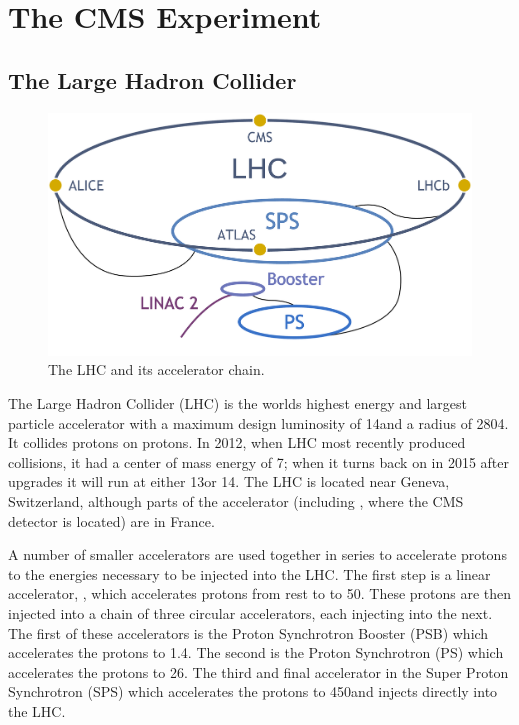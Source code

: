 
\chapter{The CMS Experiment}
\label{experiment_chapter}

\section{The Large Hadron Collider}
\label{lhc_section}

\begin{figure}[tb]
    \centering
    \includegraphics[width=\textwidth]{figures/alex_lhc_layout.pdf}
    \caption{The LHC and its accelerator chain.}
    \label{fig:lhc_layout}
\end{figure}

The Large Hadron Collider (LHC) is the worlds highest energy and largest
particle accelerator with a maximum design luminosity of 14\TeV and a radius of
2804\meters \cite{bruning2004}. It collides protons on protons. In 2012, when
LHC most recently produced collisions, it had a center of mass energy of 7\TeV;
when it turns back on in 2015 after upgrades it will run at either 13\TeV or
14\TeV. The LHC is located near Geneva, Switzerland, although parts of the
accelerator (including \pointfive, where the CMS detector is located) are in
France.

A number of smaller accelerators are used together in series to accelerate
protons to the energies necessary to be injected into the LHC. The first step
is a linear accelerator, \linactwo, which accelerates protons from rest to to
50\MeV. These protons are then injected into a chain of three circular
accelerators, each injecting into the next. The first of these accelerators is
the Proton Synchrotron Booster (PSB) which accelerates the protons to 1.4\GeV.
The second is the Proton Synchrotron (PS) which accelerates the protons to
26\GeV. The third and final accelerator in the Super Proton Synchrotron (SPS)
which accelerates the protons to 450\GeV and injects directly into the LHC.

